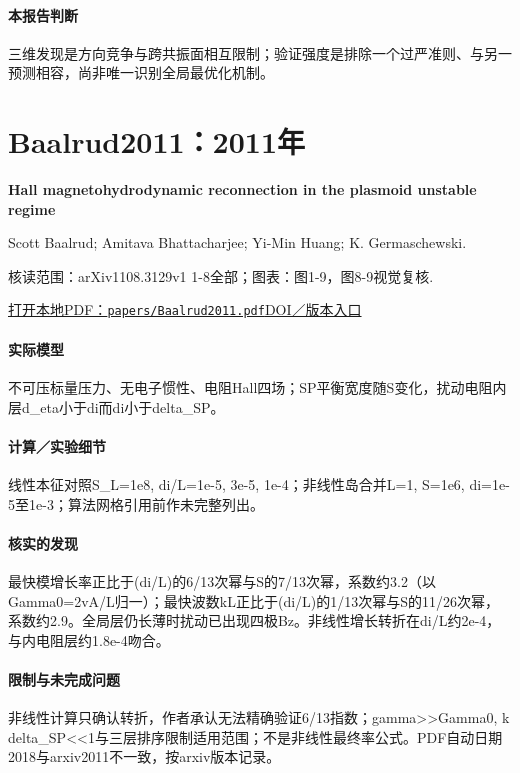 \paragraph{本报告判断}三维发现是方向竞争与跨共振面相互限制；验证强度是排除一个过严准则、与另一预测相容，尚非唯一识别全局最优化机制。

\section{Baalrud2011：2011年}\label{paper:Baalrud2011}

\textbf{Hall magnetohydrodynamic reconnection in the plasmoid unstable regime}\citep{Baalrud2011}\

Scott Baalrud;  Amitava Bhattacharjee;  Yi-Min Huang;  K. Germaschewski.

\textsf{核读范围：}arXiv1108.3129v1 1-8全部；\textsf{图表：}图1-9，图8-9视觉复核.

\href{run:papers/Baalrud2011.pdf}{打开本地PDF：\texttt{papers/Baalrud2011.pdf}}\quad\href{https://doi.org/10.1063/1.3633473}{DOI／版本入口}

\paragraph{实际模型}不可压标量压力、无电子惯性、电阻Hall四场；SP平衡宽度随S变化，扰动电阻内层d\_eta小于di而di小于delta\_SP。

\paragraph{计算／实验细节}线性本征对照S\_L=1e8, di/L=1e-5, 3e-5, 1e-4；非线性岛合并L=1, S=1e6, di=1e-5至1e-3；算法网格引用前作未完整列出。

\paragraph{核实的发现}最快模增长率正比于(di/L)的6/13次幂与S的7/13次幂，系数约3.2（以Gamma0=2vA/L归一）；最快波数kL正比于(di/L)的1/13次幂与S的11/26次幂，系数约2.9。全局层仍长薄时扰动已出现四极Bz。非线性增长转折在di/L约2e-4，与内电阻层约1.8e-4吻合。

\paragraph{限制与未完成问题}非线性计算只确认转折，作者承认无法精确验证6/13指数；gamma>>Gamma0, k delta\_SP<<1与三层排序限制适用范围；不是非线性最终率公式。PDF自动日期2018与arxiv2011不一致，按arxiv版本记录。

